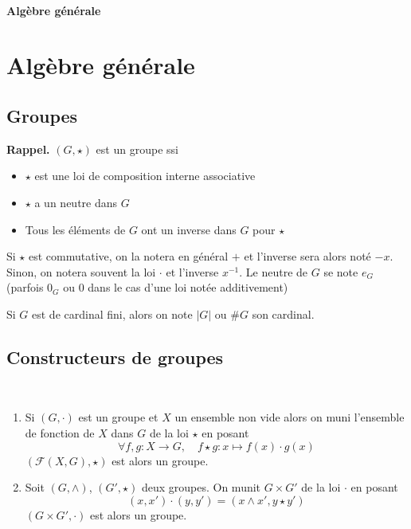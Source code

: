 
\ifsolo
    ~

    \vspace{1cm}

    \begin{center}
        \textbf{\LARGE Algèbre générale} \\[1em]
    \end{center}
    \tableofcontents
\else
    \chapter{Algèbre générale}

    \minitoc
\fi
\thispagestyle{empty}

\ifsolo \newpage \setcounter{page}{1} \fi
\section{Groupes}

\textbf{Rappel.} $(G, \star)$ est un groupe ssi \begin{itemize}
    \item $\star$ est une loi de composition interne associative
    \item $\star$ a un neutre dans $G$
    \item Tous les éléments de $G$ ont un inverse dans $G$ pour $\star$
\end{itemize}

\begin{notation}
    Si $\star$ est commutative, on la notera en général $+$ et l'inverse sera alors noté $-x$. Sinon, on notera souvent la loi $\cdot$ et l'inverse $x^{-1}$. Le neutre de $G$ se note $e_G$ (parfois $0_G$ ou $0$ dans le cas d'une loi notée additivement)
\end{notation}

Si $G$ est de cardinal fini, alors on note $|G|$ ou $\#G$ son cardinal.

\section{Constructeurs de groupes}

\begin{prop}~
    \begin{enumerate}
        \item Si $(G, \cdot)$ est un groupe et $X$ un ensemble non vide alors on muni l'ensemble de fonction de $X$ dans $G$ de la loi $\star$ en posant \[
                \forall f, g: X\longrightarrow G, \quad f\star g:x\longmapsto f(x)\cdot g(x)
            \]
            $(\mathcal F(X, G), \star)$ est alors un groupe.
        \item Soit $(G, \land)$, $(G', \star)$ deux groupes. On munit $G\times G'$ de la loi $\cdot$ en posant \[
                (x, x')\cdot (y, y')=(x\land x', y\star y')
            \]
            $(G\times G', \cdot)$ est alors un groupe.
    \end{enumerate}
\end{prop}

